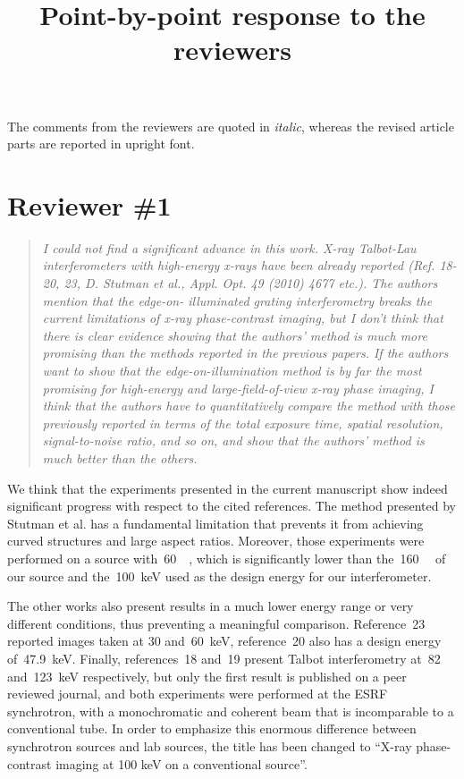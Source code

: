 \documentclass[a4paper,english]{scrartcl}
\title{Point-by-point response to the reviewers}
\date{}
\newenvironment{reviewerquote}{\begin{quote}\itshape}{\end{quote}}
\begin{document}
\maketitle

\noindent
The comments from the reviewers are quoted in \emph{italic}, whereas the
revised article parts are reported in upright font.
\section*{Reviewer \#1}
\begin{reviewerquote}
    I could not find a significant advance in this work. X-ray Talbot-Lau
    interferometers with high-energy x-rays have been already reported (Ref.
    18-20, 23, D. Stutman et al., Appl. Opt. 49 (2010) 4677 etc.). The
    authors mention that the edge-on- illuminated grating interferometry
    breaks the current limitations of x-ray phase-contrast imaging, but I
    don't think that there is clear evidence showing that the authors'
    method is much more promising than the methods reported in the previous
    papers. If the authors want to show that the edge-on-illumination method
    is by far the most promising for high-energy and large-field-of-view
    x-ray phase imaging, I think that the authors have to quantitatively
    compare the method with those previously reported in terms of the total
    exposure time, spatial resolution, signal-to-noise ratio, and so on, and
    show that the authors' method is much better than the others.
\end{reviewerquote}
We think that the experiments presented in the current manuscript show
indeed significant progress with respect to the cited references.
The method presented by Stutman et al. has a fundamental limitation that
prevents it from achieving curved structures and large aspect ratios.
Moreover, those experiments were performed on a source
with~\SI{60}{\kilo\voltpeak}, which is significantly lower than
the~\SI{160}{\kilo\voltpeak} of our source and the~\SI{100}{\kilo\eV} used
as the design energy for our interferometer.

The other works also present results in a much lower energy range or very
different conditions, thus preventing a meaningful comparison.
Reference~23 reported images taken at \num{30} and~\SI{60}{\kilo\eV},
reference~20 also has a design energy of~\SI{47.9}{\kilo\eV}. Finally,
references~18 and~19 present Talbot interferometry at~\num{82}
and~\SI{123}{\kilo\eV} respectively, but only the first result is published
on a peer reviewed journal, and both experiments were performed at the ESRF
synchrotron, with a monochromatic and coherent beam that is incomparable to
a conventional tube.
In order to emphasize this enormous difference between synchrotron sources
and lab sources, the title has been changed to ``X-ray phase-contrast imaging at
100 keV on
a conventional source''.
\end{document}
